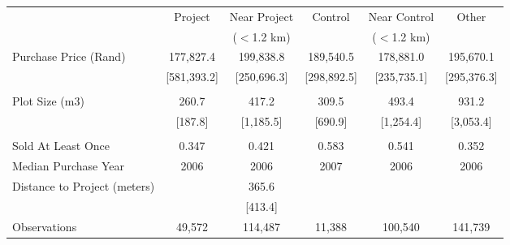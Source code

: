 \begin{tabu}{lccccc}
\toprule
 & Project       & Near Project       & Control        & Near Control       & Other     \\
 &        & ($<$1.2 km)       &        & ($<$1.2 km)       &      \\
\midrule
 Purchase Price (Rand)  & 177,827.4  & 199,838.8  & 189,540.5  & 178,881.0  & 195,670.1  \\ 
\rowfont{\footnotesize} & [581,393.2]  & [250,696.3]  & [298,892.5]  & [235,735.1]  & [295,376.3]  \\ 
 &  &  &  &  &  \\ 
 Plot Size (m3)  & 260.7  & 417.2  & 309.5  & 493.4  & 931.2  \\ 
\rowfont{\footnotesize} & [187.8]  & [1,185.5]  & [690.9]  & [1,254.4]  & [3,053.4]  \\ 
 &  &  &  &  &  \\ 
 Sold At Least Once  & 0.347  & 0.421  & 0.583  & 0.541  & 0.352  \\ 
 Median Purchase Year  & 2006  & 2006  & 2007  & 2006  & 2006  \\ 
 Distance to Project (meters) &  & 365.6  & \\
 \rowfont{\footnotesize} &  & [413.4]  & \\
\midrule
 Observations  & 49,572  & 114,487  & 11,388  & 100,540  & 141,739  \\ 
\bottomrule
\end{tabu}
